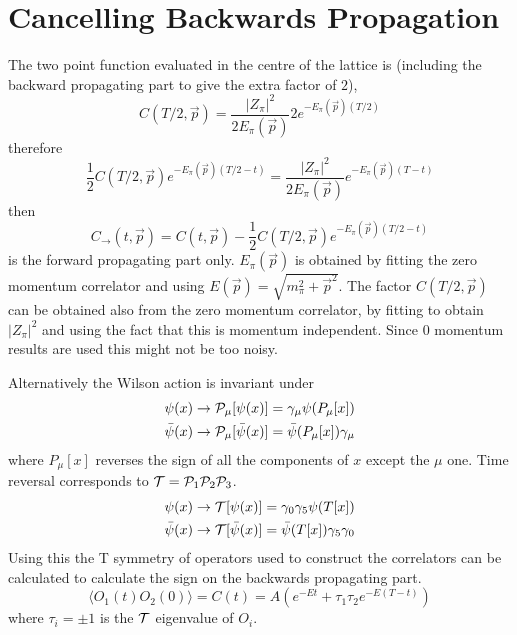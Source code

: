 \documentclass[3p,preprint]{elsarticle}
\begin{document}
\section{Cancelling Backwards Propagation}
The two point function evaluated in the centre of the lattice is (including the
backward propagating part to give the extra factor of $2$),
\begin{equation}
C(T/2, \vec{p}) = \frac{ |Z_\pi|^2 }{ 2 E_\pi(\vec{p}) }   2 e^{- E_\pi(\vec{p}) (T/2) }
\end{equation}
therefore
\begin{equation}
\frac{1}{2} C(T/2, \vec{p}) e^{ - E_\pi(\vec{p}) (T/2 - t)  } = \frac{ |Z_\pi|^2 }{ 2 E_\pi(\vec{p}) } e^{- E_\pi(\vec{p}) (T - t) }
\end{equation}
then
\begin{equation}
C_{\rightarrow}(t, \vec{p}) = C(t, \vec{p}) - \frac{1}{2} C(T/2, \vec{p}) e^{ - E_\pi(\vec{p}) (T/2 - t)  }
\end{equation}
is the forward propagating part only. $E_\pi(\vec{p})$ is obtained by fitting the zero momentum correlator
and using $E(\vec{p}) = \sqrt{m_\pi^2 + \vec{p}^2} $. The factor $C(T/2, \vec{p})$ can be obtained also from
the zero momentum correlator, by fitting to obtain $|Z_\pi|^2$ and using the fact that this is momentum independent.
Since $0$ momentum results are used this might not be too noisy.

Alternatively the Wilson action is invariant under
\begin{eqnarray}
	\psi(x) \rightarrow {\cal P_\mu}[ \psi(x) ] = \gamma_\mu \psi( P_\mu[x]) \\
	\bar{ \psi } (x) \rightarrow {\cal P_\mu}[ \bar{ \psi } (x) ] = \bar{ \psi }( P_\mu[x])  \gamma_\mu
\end{eqnarray}
where $P_\mu[x]$ reverses the sign of all the components of $x$ except the $\mu$ one. Time reversal corresponds to
${\cal T} = {\cal P}_1{\cal P}_2{\cal P}_3$.
\begin{eqnarray}
	\psi(x) \rightarrow {\cal T}[ \psi(x) ] = \gamma_0 \gamma_5 \psi( T[x]) \\
	\bar{ \psi } (x) \rightarrow {\cal T}[ \bar{ \psi } (x) ] = \bar{ \psi }( T[x])  \gamma_5 \gamma_0
\end{eqnarray}
Using this the T symmetry of operators used to construct the correlators can be calculated to calculate
the sign on the backwards propagating part.
\begin{equation}
\langle O_1(t) O_2(0) \rangle = C(t) = A \left( e^{ -Et} + \tau_1 \tau_2 e^{-E(T - t)}\right)
\end{equation}
where $\tau_i = \pm 1$ is the ${\cal T}$ eigenvalue of $O_i$.
\end{document}
